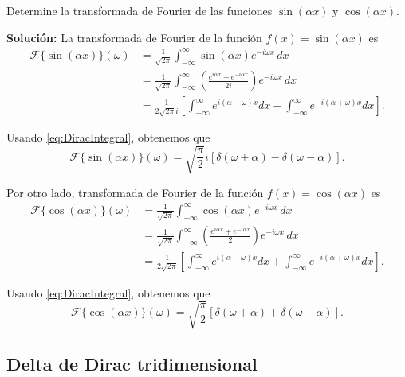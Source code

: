 \begin{ejemplo}
    Determine la transformada de Fourier de las funciones $\sin(\alpha x)$ y $\cos(\alpha x)$.

    \textbf{Solución:} La transformada de Fourier de la función $f(x) = \sin (\alpha x)$ es
    \begin{align}
        \mathcal{F}\{\sin(\alpha x)\}(\omega) &= \frac{1}{\sqrt{2\pi}} \int_{-\infty}^{\infty} \sin(\alpha x) e^{-i\omega x} \,dx \nonumber\\
    &=  \frac{1}{\sqrt{2\pi}} \int_{-\infty}^{\infty} \left(\frac{e^{i\alpha x} - e^{-i\alpha x}}{2i} \right) e^{-i\omega x} \,dx \nonumber \\
    &= \frac{1}{2 \sqrt{2\pi} i} \left[\int_{-\infty}^{\infty} e^{i(\alpha - \omega)x} dx - \int_{-\infty}^{\infty} e^{-i(\alpha + \omega)x} dx\right].
    \end{align}

    Usando \eqref{eq:DiracIntegral}, obtenemos que 
    \begin{equation}
        \mathcal{F}\{\sin(\alpha x)\}(\omega) = \sqrt{\frac{\pi}{2}} i \left[\delta(\omega + \alpha) - \delta(\omega - \alpha)\right].
    \end{equation}

    Por otro lado, transformada de Fourier de la función $f(x) = \cos(\alpha x)$ es
    \begin{align}
        \mathcal{F}\{\cos(\alpha x)\}(\omega) &= \frac{1}{\sqrt{2\pi}} \int_{-\infty}^{\infty} \cos(\alpha x) e^{-i\omega x} \,dx \nonumber\\
    &=  \frac{1}{\sqrt{2\pi}} \int_{-\infty}^{\infty} \left(\frac{e^{i\alpha x} + e^{-i\alpha x}}{2} \right) e^{-i\omega x} \,dx \nonumber \\
    &= \frac{1}{2 \sqrt{2\pi}} \left[\int_{-\infty}^{\infty} e^{i(\alpha - \omega)x} dx + \int_{-\infty}^{\infty} e^{-i(\alpha + \omega)x} dx\right].
    \end{align}

    Usando \eqref{eq:DiracIntegral}, obtenemos que 
    \begin{equation}
        \mathcal{F}\{\cos(\alpha x)\}(\omega) = \sqrt{\frac{\pi}{2}} \left[\delta(\omega + \alpha) + \delta(\omega - \alpha)\right].
    \end{equation}
\end{ejemplo}

\subsection*{Delta de Dirac tridimensional}

